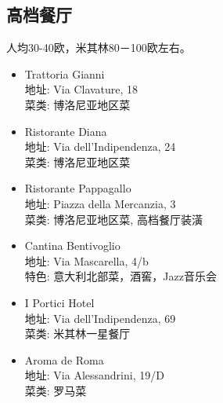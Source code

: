 \subsection{高档餐厅}
人均30-40欧，米其林80－100欧左右。

\begin{itemize}
\item Trattoria Gianni\\
地址: Via Clavature, 18\\
菜类: 博洛尼亚地区菜

\item Ristorante Diana\\
地址: Via dell'Indipendenza, 24\\
菜类: 博洛尼亚地区菜

\item Ristorante Pappagallo\\
地址: Piazza della Mercanzia, 3\\
菜类: 博洛尼亚地区菜, 高档餐厅装潢

\item Cantina Bentivoglio\\
地址: Via Mascarella, 4/b\\
特色: 意大利北部菜，酒窖，Jazz音乐会

\item I Portici Hotel\\
地址: Via dell'Indipendenza, 69\\
菜类: 米其林一星餐厅

\item Aroma de Roma\\
地址: Via Alessandrini, 19/D\\
菜类: 罗马菜
\end{itemize}

